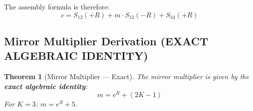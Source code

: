 \documentclass[11pt]{article}
\newtheorem{theorem}{Theorem}
\begin{document}
The assembly formula is therefore:
\begin{equation}
\boxed{c = S_{12}(+R) + m \cdot S_{12}(-R) + S_{34}(+R)}
\end{equation}

\subsection{Mirror Multiplier Derivation (EXACT ALGEBRAIC IDENTITY)}

\begin{theorem}[Mirror Multiplier --- Exact]
The mirror multiplier is given by the \textbf{exact algebraic identity}:
\begin{equation}
\boxed{m = e^R + (2K-1)}
\end{equation}
For $K=3$: $m = e^R + 5$.
\end{theorem}
\end{document}
